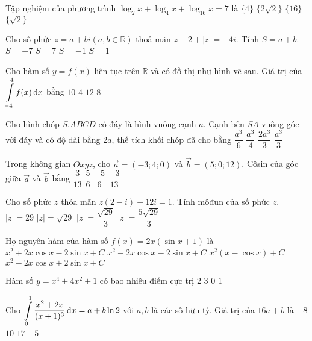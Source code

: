 \begin{ex}%
Tập nghiệm của phương trình $\log_2 x+\log_4 x+\log_{16} x=7$ là
\choice
{$\{4\}$}
{$\{2\sqrt{2}\}$}
{\True $\{16\}$}
{$\{\sqrt{2}\}$}

\end{ex}
\begin{ex}%
Cho số phức $z=a+b i(a, b \in \mathbb{R})$ thoả mãn $z-2+|z|=-4 i$. Tính $S=a+b$.
\choice
{\True $S=-7$}
{$S=7$}
{$S=-1$}
{$S=1$}

\end{ex}
\begin{ex}%
Cho hàm số $y=f(x)$ liên tục trên $\mathbb{R}$ và có đồ thị như hình vẽ sau. Giá trị của $\displaystyle\displaystyle\int\limits_{-4}^4 f(x)\mathrm{\,d}x$ bằng
\choice
{$10$}
{$4$}
{$12$}
{\True $8$}

\end{ex}
\begin{ex}%
Cho hình chóp $S.ABCD$ có đáy là hình vuông cạnh $a$. Cạnh bên $SA$ vuông góc với đáy và có độ dài bằng $2 a$, thể tích khối chóp đã cho bằng
\choice
{$\dfrac{a^3}{6}$}
{$\dfrac{a^3}{4}$}
{\True $\dfrac{2 a^3}{3}$}
{$\dfrac{a^3}{3}$}

\end{ex}
\begin{ex}%
Trong không gian $O x y z$, cho $\vec{a}=(-3; 4; 0)$ và $\vec{b}=(5; 0; 12)$. Côsin của góc giữa $\vec{a}$ và $\vec{b}$ bằng
\choice
{$\dfrac{3}{13}$}
{$\dfrac{5}{6}$}
{$\dfrac{-5}{6}$}
{\True $\dfrac{-3}{13}$}

\end{ex}
\begin{ex}%
Cho số phức $z$ thỏa mãn $z(2-i)+12 i=1$. Tính môđun của số phức $z$.
\choice
{$|z|=29$}
{\True $|z|=\sqrt{29}$}
{$|z|=\dfrac{\sqrt{29}}{3}$}
{$|z|=\dfrac{5\sqrt{29}}{3}$}

\end{ex}
\begin{ex}%
Họ nguyên hàm của hàm số $f(x)=2 x(\sin x+1)$ là
\choice
{$x^2+2 x \cos x-2\sin x+C$}
{$x^2-2 x \cos x-2\sin x+C$}
{$x^2(x-\cos x)+C$}
{\True $x^2-2 x \cos x+2\sin x+C$}

\end{ex}
\begin{ex}%
Hàm số $y=x^4+4 x^2+1$ có bao nhiêu điểm cực trị
\choice
{$2$}
{$3$}
{$0$}
{\True $1$}

\end{ex}
\begin{ex}%
Cho $\displaystyle\displaystyle\int\limits_0^1 \dfrac{x^2+2 x}{(x+1)^3} \mathrm{\,d} x=a+b \ln 2$ với $a, b$ là các số hữu tỷ. Giá trị của $16 a+b$ là
\choice
{$-8$}
{$10$}
{$17$}
{\True $-5$}

\end{ex}
